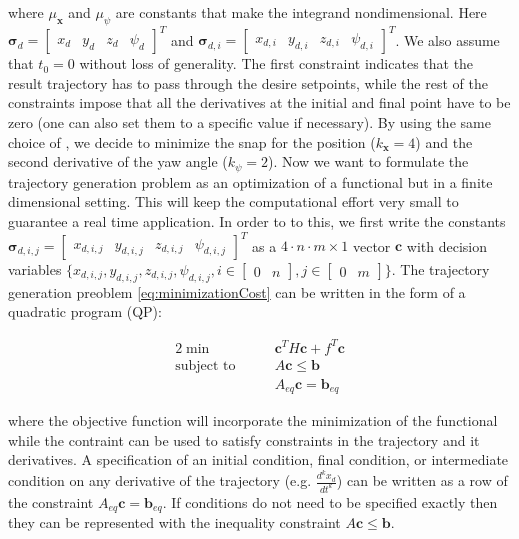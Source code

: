 \noindent where $\mu_{\mathbf{x}}$ and $\mu_{\psi}$ are constants that make the integrand nondimensional. Here $\boldsymbol{\sigma}_d = \begin{bmatrix} x_d & y_d & z_d & \psi_d\end{bmatrix}^T$ and $\boldsymbol{\sigma}_{d,i}=\begin{bmatrix}x_{d,i} & y_{d,i} & z_{d,i} & \psi_{d,i}\end{bmatrix}^T$. We also assume that $t_0=0$ without loss of generality. The first constraint indicates that the result trajectory has to pass through the desire setpoints, while the rest of the constraints impose that all the derivatives at the initial and final point have to be zero (one can also set them to a specific value if necessary). By using the same choice of \cite{minimumSnap2}, we decide to minimize the snap for the position ($k_{\mathbf{x}}=4$) and the second derivative of the yaw angle ($k_{\psi}=2$). Now we want to formulate the trajectory generation problem as an optimization of a functional but in a finite dimensional setting. This will keep the computational effort very small to guarantee a real time application. In order to to this, we first write the constants $\boldsymbol{\sigma}_{d,i,j} =\begin{bmatrix}x_{d,i,j} & y_{d,i,j} & z_{d,i,j} & \psi_{d,i,j}\end{bmatrix}^T$ as a $4\cdot n\cdot m\times 1$ vector $\mathbf{c}$ with decision variables $\{x_{d,i,j} , y_{d,i,j} , z_{d,i,j} , \psi_{d,i,j}, i \in \begin{bmatrix}0 & n\end{bmatrix}, j \in \begin{bmatrix}0 & m\end{bmatrix}\}$. The trajectory generation preoblem \eqref{eq:minimizationCost} can be written in the form of a quadratic program (QP):

\begin{alignat}{2}
	\min\qquad & \mathbf{c}^TH\mathbf{c} + f^T\mathbf{c} \\
	\text{subject to}\qquad & A\mathbf{c} \le \mathbf{b} \nonumber \\
	& A_{eq}\mathbf{c} = \mathbf{b}_{eq} \nonumber
	\label{eq:quadraticProgram}
\end{alignat}

\noindent where the objective function will incorporate the minimization of the functional while the contraint can be used to satisfy constraints in the trajectory and it derivatives. A specification of an initial condition, final condition, or intermediate condition on any derivative of the trajectory (e.g. $\frac{d^kx_d}{dt^k}$) can be written as a row of the constraint $A_{eq}\mathbf{c} = \mathbf{b}_{eq}$. If conditions do not need to be
specified exactly then they can be represented with the inequality constraint $A\mathbf{c}\le \mathbf{b}$. 

